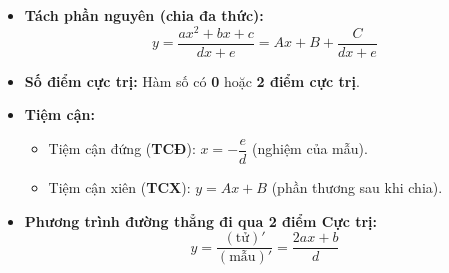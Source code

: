 \documentclass[12pt,a4paper]{article}
\begin{document}

\vspace{0.15cm}

\begin{theorybox}
    \begin{itemize}\setlength{\itemsep}{3pt}
        \item \textbf{Tách phần nguyên (chia đa thức):}
        \[
            y = \frac{ax^2+bx+c}{dx+e} = Ax + B + \frac{C}{dx+e}
        \]
        \item \textbf{Số điểm cực trị:} Hàm số có \textbf{0} hoặc \textbf{2 điểm cực trị}.
        \item \textbf{Tiệm cận:}
        \begin{itemize}\setlength{\itemsep}{2pt}
            \item Tiệm cận đứng (\textbf{TCĐ}): $x = -\dfrac{e}{d}$ (nghiệm của mẫu).
            \item Tiệm cận xiên (\textbf{TCX}): $y = Ax + B$ (phần thương sau khi chia).
        \end{itemize}
        \item \textbf{Phương trình đường thẳng đi qua 2 điểm Cực trị:}
        \[
            y = \frac{(\text{tử})'}{(\text{mẫu})'} = \frac{2ax + b}{d}
        \]
    \end{itemize}
\end{theorybox}

\vspace{0.25cm}
\vspace{0.2cm}

\end{document}
